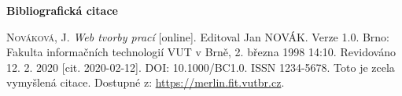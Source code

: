 \bigskip

\noindent \textbf{Bibliografická citace}

\medskip

\noindent \textsc{Nováková}, J. \textit{Web tvorby prací} [online]. Editoval Jan NOVÁK. Verze 1.0. Brno: Fakulta informačních technologií VUT v Brně, 2. března 1998 14:10. Revidováno 12. 2. 2020 [cit. 2020-02-12]. DOI: 10.1000/BC1.0. ISSN 1234-5678. Toto je zcela vymyšlená citace. Dostupné z: \url{https://merlin.fit.vutbr.cz}.